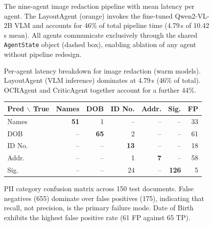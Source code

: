 \documentclass[conference]{IEEEtran}
\begin{document}
\begin{figure}[t]
\begin{tikzpicture}
\end{tikzpicture}
\caption{The nine-agent image redaction pipeline
  with mean latency per agent.
  The LayoutAgent (orange) invokes the fine-tuned
  Qwen2-VL-2B VLM and accounts for 46\% of
  total pipeline time (4.79\,s of 10.42\,s mean).
  All agents communicate exclusively through
  the shared \texttt{AgentState} object
  (dashed box), enabling ablation of any
  agent without pipeline redesign.}
\label{fig:pipeline}
\end{figure}

\begin{figure}[t]
\centering
{}
\caption{Per-agent latency breakdown for image
  redaction (warm models). LayoutAgent (VLM
  inference) dominates at 4.79\,s (46\% of total).
  OCRAgent and CriticAgent together account for
  a further 44\%.}
\label{fig:timings}
\end{figure}

\begin{figure}[t]
\centering
\footnotesize
\setlength{\tabcolsep}{4pt}
\begin{tabular}{lrrrrrr}
\toprule
Pred $\backslash$ True & Names & DOB & ID No. & Addr. & Sig. & FP \\
\midrule
Names & \textbf{51} & 1 & -- & -- & -- & 33 \\
DOB & -- & \textbf{65} & 2 & -- & -- & 61 \\
ID No. & -- & -- & \textbf{13} & -- & -- & 18 \\
Addr. & -- & -- & 1 & \textbf{7} & -- & 58 \\
Sig. & -- & -- & 24 & -- & \textbf{126} & 5 \\
\bottomrule
\end{tabular}
\caption{PII category confusion matrix across
  150 test documents. False negatives (655)
  dominate over false positives (175), indicating
  that recall, not precision, is the primary
  failure mode. Date of Birth exhibits the highest
  false positive rate (61 FP against 65 TP).}
\label{fig:confusion}
\end{figure}
\end{document}
